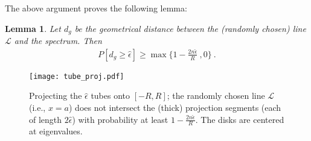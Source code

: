 \documentclass{article}
\newtheorem{lemma}[theorem]{Lemma}
\theoremstyle{definition}
\begin{document}
The above argument proves the following lemma:

\begin{lemma} \label{dist}
Let $d_g$ be the geometrical distance between the (randomly chosen) line $\mathcal{L}$ and the spectrum. Then
\begin{eqnarray} \label{prob_bound}
P[d_g \geq \hat{\epsilon}] \geq \max \{1 - \frac{2n \hat{\epsilon}}{R}~, 0\}~.
\end{eqnarray}
\end{lemma}

\begin{figure}[ht!]
\begin{center}
\texttt{[image: tube\_proj.pdf]}
\caption{Projecting the $\hat{\epsilon}$ tubes onto $[-R, R]$; the randomly chosen line $\mathcal{L}$ (i.e., $x=a$) does not intersect the (thick) projection segments (each of length $2 \hat{\epsilon}$) with probability at least $1 - \frac{2n \hat{\epsilon}}{R}$. The disks are centered at eigenvalues.} \label{tube}
\end{center}
\end{figure}

\end{document}
